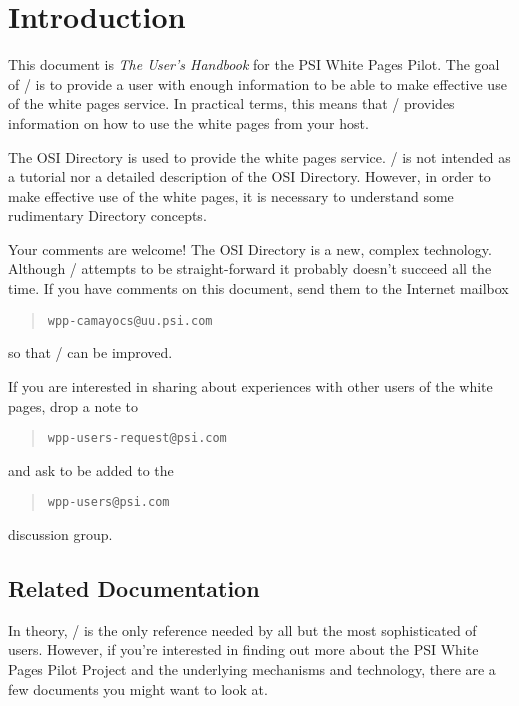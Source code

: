 
\chapter	{Introduction}
This document is {\em The User's Handbook\/} for the
PSI White Pages Pilot.
The goal of \thebook/ is to provide a user with enough information to be able
to make effective use of the white pages service.
In practical terms,
this means that \thebook/ provides information on how
to use the white pages from your host.

The OSI Directory is used to provide the white pages service.
\thebook/ is not intended as a tutorial nor a detailed description
of the OSI Directory.
However,
in order to make effective use of the white pages,
it is necessary to understand some rudimentary Directory concepts.

Your comments are welcome!
The OSI Directory is a new, complex technology.
Although \thebook/ attempts to be straight-forward it probably doesn't
succeed all the time.
If you have comments on this document, send them to the Internet
mailbox
\begin{quote}\begin{verbatim}
wpp-camayocs@uu.psi.com
\end{verbatim}\end{quote}
so that \thebook/ can be improved.

If you are interested in sharing about experiences with other users of the
white pages, drop a note to
\begin{quote}\begin{verbatim}
wpp-users-request@psi.com
\end{verbatim}\end{quote}
and ask to be added to the
\begin{quote}\begin{verbatim}
wpp-users@psi.com
\end{verbatim}\end{quote}
discussion group.

\newpage

\section*	{Related Documentation}
In theory,
\thebook/ is the only reference needed by all but the most sophisticated of
users.
However,
if you're interested in finding out more about the PSI White Pages
Pilot Project and the underlying mechanisms and technology,
there are a few documents you might want to look at.

